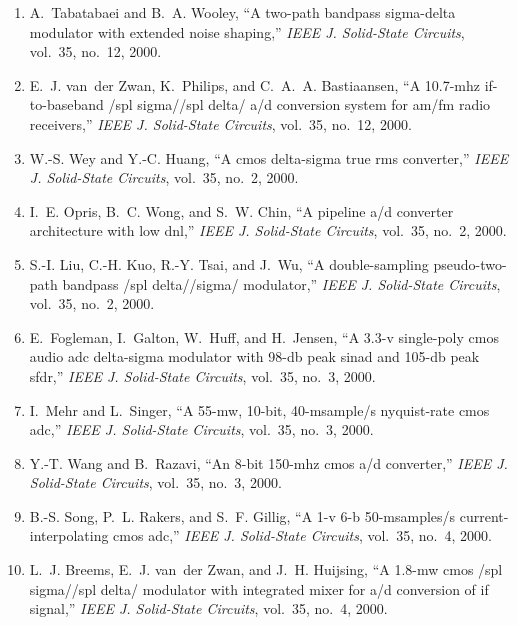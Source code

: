 \begin{enumerate}
\item
A.~Tabatabaei and B.~A. Wooley, ``A two-path bandpass sigma-delta modulator
  with extended noise shaping,'' \emph{{IEEE} J. Solid-State Circuits},
  vol.~35, no.~12, 2000.

\item
E.~J. van~der Zwan, K.~Philips, and C.~A.~A. Bastiaansen, ``A 10.7-mhz
  if-to-baseband /spl sigma//spl delta/ a/d conversion system for am/fm radio
  receivers,'' \emph{{IEEE} J. Solid-State Circuits}, vol.~35, no.~12, 2000.

\item
W.-S. Wey and Y.-C. Huang, ``A cmos delta-sigma true rms converter,''
  \emph{{IEEE} J. Solid-State Circuits}, vol.~35, no.~2, 2000.

\item
I.~E. Opris, B.~C. Wong, and S.~W. Chin, ``A pipeline a/d converter
  architecture with low dnl,'' \emph{{IEEE} J. Solid-State Circuits}, vol.~35,
  no.~2, 2000.

\item
S.-I. Liu, C.-H. Kuo, R.-Y. Tsai, and J.~Wu, ``A double-sampling
  pseudo-two-path bandpass /spl delta//sigma/ modulator,'' \emph{{IEEE} J.
  Solid-State Circuits}, vol.~35, no.~2, 2000.

\item
E.~Fogleman, I.~Galton, W.~Huff, and H.~Jensen, ``A 3.3-v single-poly cmos
  audio adc delta-sigma modulator with 98-db peak sinad and 105-db peak sfdr,''
  \emph{{IEEE} J. Solid-State Circuits}, vol.~35, no.~3, 2000.

\item
I.~Mehr and L.~Singer, ``A 55-mw, 10-bit, 40-msample/s nyquist-rate cmos adc,''
  \emph{{IEEE} J. Solid-State Circuits}, vol.~35, no.~3, 2000.

\item
Y.-T. Wang and B.~Razavi, ``An 8-bit 150-mhz cmos a/d converter,'' \emph{{IEEE}
  J. Solid-State Circuits}, vol.~35, no.~3, 2000.

\item
B.-S. Song, P.~L. Rakers, and S.~F. Gillig, ``A 1-v 6-b 50-msamples/s
  current-interpolating cmos adc,'' \emph{{IEEE} J. Solid-State Circuits},
  vol.~35, no.~4, 2000.

\item
L.~J. Breems, E.~J. van~der Zwan, and J.~H. Huijsing, ``A 1.8-mw cmos /spl
  sigma//spl delta/ modulator with integrated mixer for a/d conversion of if
  signal,'' \emph{{IEEE} J. Solid-State Circuits}, vol.~35, no.~4, 2000.


\end{enumerate}
